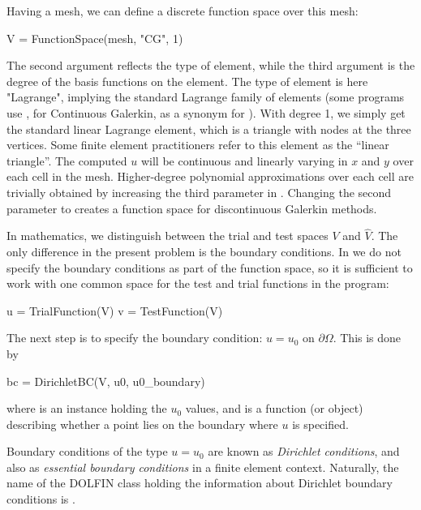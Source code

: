 Having a mesh, we can define a discrete function space  over this
mesh: 
\begin{python}
  V = FunctionSpace(mesh, "CG", 1)
\end{python}
The second argument reflects the type of element, while the third
argument is the degree of the basis functions on the element.
The type of element is here "Lagrange", implying the standard Lagrange
family of elements (some \fenics{} programs use , for
Continuous Galerkin, as a synonym for ).  With degree 1,
we simply get the standard linear Lagrange element, which is a triangle
with nodes at the three vertices.  Some finite element practitioners
refer to this element as the ``linear triangle''.  The computed $u$
will be continuous and linearly varying in $x$ and $y$ over each
cell in the mesh.  Higher-degree polynomial approximations over
each cell are trivially obtained by increasing the third parameter
in . Changing the second parameter to 
creates a function space for discontinuous Galerkin methods.

In mathematics, we distinguish between the trial and test spaces $V$
and $\hat{V}$. The only difference in the present problem is the
boundary conditions. In \fenics{} we do not specify the boundary
conditions as part of the function space, so it is sufficient to work
with one common space  for the test and trial functions in the
program:
\begin{python}
u = TrialFunction(V)
v = TestFunction(V)
\end{python}

The next step is to specify the boundary condition:
$u=u_0$ on $\partial\Omega$. This is done
by
\begin{python}
bc = DirichletBC(V, u0, u0_boundary)
\end{python}
where  is an instance holding the $u_0$ values, and
 is a function (or object) describing whether a point
lies on the boundary where $u$ is specified.

Boundary conditions of the type $u=u_0$ are known as \emph{Dirichlet
conditions}, and also as \emph{essential boundary conditions} in a finite
element context.  Naturally, the name of the DOLFIN class holding the
information about Dirichlet boundary conditions is .


